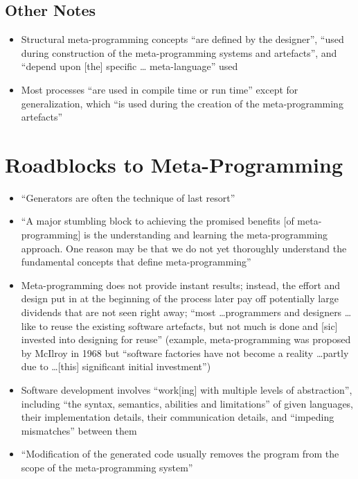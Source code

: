 \subsection{Other Notes}
\begin{itemize}
      \item Structural meta-programming concepts ``are defined by the
            designer'', ``used during construction of the meta-programming
            systems and artefacts'', and ``depend upon [the] specific \dots
            meta-language'' used \cite[p.~24]{stuikys_taxonomy_2013}
      \item Most processes ``are used in compile time or run time'' except for
            generalization, which ``is used during the creation of the
            meta-programming artefacts'' \cite[pp.~24-25]{stuikys_taxonomy_2013}
\end{itemize}

\section{Roadblocks to Meta-Programming}
\label{chap:notes:sec:metaprogramming-roadblocks}
\begin{itemize}
      \item ``Generators are often the technique of last resort''
            \cite[p.~2]{smaragdakis_structured_2017}
      \item ``A major stumbling block to achieving the promised benefits
                  [of meta-programming] is the understanding and learning the
            meta-programming approach. One reason may be that we do not yet
            thoroughly understand the fundamental concepts that define
            meta-programming'' \cite[p.~26]{stuikys_taxonomy_2013}
      \item Meta-programming does not provide instant results; instead, the
            effort and design put in at the beginning of the process later pay
            off potentially large dividends that are not seen right away;
            ``most \dots programmers and designers \dots like to reuse the
            existing software artefacts, but not much is done and [sic]
            invested into designing for reuse'' \cite[p.~26]{stuikys_taxonomy_2013}
            (example, meta-programming was proposed by McIlroy in 1968 but
            ``software factories have not become a reality \dots partly due to
            \dots [this] significant initial investment'')
            \cite[p.~27]{stuikys_taxonomy_2013}
      \item Software development involves ``work[ing] with multiple levels of
            abstraction'', including ``the syntax, semantics, abilities and
            limitations'' of given languages, their implementation details,
            their communication details, and ``impeding mismatches'' between
            them \cite[p.~27]{stuikys_taxonomy_2013}
      \item ``Modification of the generated code usually removes the program
            from the scope of the meta-programming system''
            \cite[p.~27]{stuikys_taxonomy_2013}
\end{itemize}

